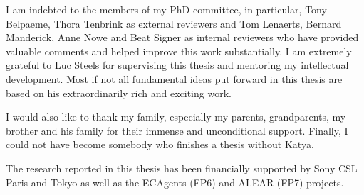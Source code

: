 I am indebted to the members of my PhD committee, in particular, 
Tony Belpaeme, Thora Tenbrink as external reviewers and Tom Lenaerts, 
Bernard Manderick, Anne Nowe and Beat Signer as internal reviewers
who have provided valuable comments and helped improve this work
substantially. I am extremely grateful to Luc Steels for supervising this thesis 
and mentoring my intellectual development. Most if not all fundamental 
ideas put forward in this thesis are based on his extraordinarily rich 
and exciting work.

I would also like to thank my family, especially my
parents, grandparents, my brother and his family for
their immense and unconditional support. 
Finally, I could not have become somebody
who finishes a thesis without Katya.

The research reported in this thesis has been financially supported 
by Sony CSL Paris and Tokyo as well as the ECAgents (FP6) and 
ALEAR (FP7) projects.